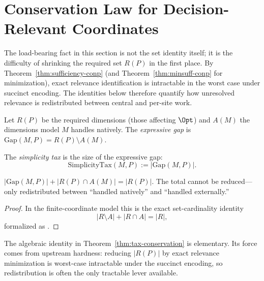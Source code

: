 \section{Conservation Law for Decision-Relevant Coordinates}\label{sec:simplicity-tax}

The load-bearing fact in this section is not the set identity itself; it is the difficulty of shrinking the required set $R(P)$ in the first place. By Theorem~\ref{thm:sufficiency-conp} (and Theorem~\ref{thm:minsuff-conp} for minimization), exact relevance identification is intractable in the worst case under succinct encoding. The identities below therefore quantify how unresolved relevance is redistributed between central and per-site work.

\begin{definition}
Let $R(P)$ be the required dimensions (those affecting $\Opt$) and $A(M)$ the dimensions model $M$ handles natively. The \emph{expressive gap} is $\text{Gap}(M,P) = R(P) \setminus A(M)$.
\end{definition}

\begin{definition}\label{def:simplicity-tax}
The \emph{simplicity tax} is the size of the expressive gap:
\[
\text{SimplicityTax}(M,P) := |\text{Gap}(M,P)|.
\]
\end{definition}

\begin{theorem}\label{thm:tax-conservation}
$|\text{Gap}(M, P)| + |R(P) \cap A(M)| = |R(P)|$. The total cannot be reduced---only redistributed between ``handled natively'' and ``handled externally.''
\end{theorem}

\begin{proof}
In the finite-coordinate model this is the exact set-cardinality identity
\[
|R\setminus A| + |R\cap A| = |R|,
\]
formalized as .
\end{proof}

\begin{remark}
The algebraic identity in Theorem~\ref{thm:tax-conservation} is elementary. Its force comes from upstream hardness: reducing $|R(P)|$ by exact relevance minimization is worst-case intractable under the succinct encoding, so redistribution is often the only tractable lever available.
\end{remark}


